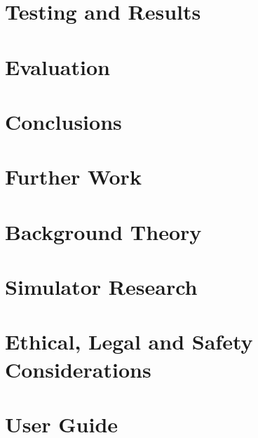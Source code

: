\documentclass[11pt,a4paper,twoside,openright]{report}
\begin{document}
\chapter{Testing and Results}\label{results}



\chapter{Evaluation}



\chapter{Conclusions}


\chapter{Further Work}





\newpage


\begin{appendices}
\appendix
\chapter[Background Theory Diagrams]{Background Theory}

\chapter[Indepth Simulator Research]{Simulator Research} \label{SimulatorResearch}


\chapter{Ethical, Legal and Safety Considerations}


\chapter{User Guide} \label{UserGuide}




\end{appendices}
\end{document}
